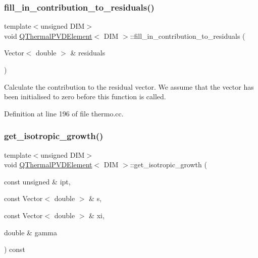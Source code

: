 \subsubsection{\texorpdfstring{fill\+\_\+in\+\_\+contribution\+\_\+to\+\_\+residuals()}{fill\_in\_contribution\_to\_residuals()}}
{\footnotesize\ttfamily template$<$unsigned D\+IM$>$ \\
void \hyperlink{classQThermalPVDElement}{Q\+Thermal\+P\+V\+D\+Element}$<$ D\+IM $>$\+::fill\+\_\+in\+\_\+contribution\+\_\+to\+\_\+residuals (\begin{DoxyParamCaption}\item[{Vector$<$ double $>$ \&}]{residuals }\end{DoxyParamCaption})\hspace{0.3cm}{\ttfamily [inline]}}



Calculate the contribution to the residual vector. We assume that the vector has been initialised to zero before this function is called. 



Definition at line 196 of file thermo.\+cc.

\mbox{\label{classQThermalPVDElement_a25774a0b8d2a7ec688e91420527cc5c4}} 
\subsubsection{\texorpdfstring{get\+\_\+isotropic\+\_\+growth()}{get\_isotropic\_growth()}}
{\footnotesize\ttfamily template$<$unsigned D\+IM$>$ \\
void \hyperlink{classQThermalPVDElement}{Q\+Thermal\+P\+V\+D\+Element}$<$ D\+IM $>$\+::get\+\_\+isotropic\+\_\+growth (\begin{DoxyParamCaption}\item[{const unsigned \&}]{ipt,  }\item[{const Vector$<$ double $>$ \&}]{s,  }\item[{const Vector$<$ double $>$ \&}]{xi,  }\item[{double \&}]{gamma }\end{DoxyParamCaption}) const\hspace{0.3cm}{\ttfamily [inline]}}



